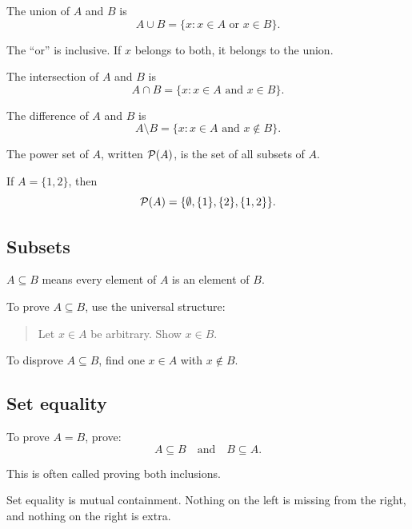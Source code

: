 \documentclass[12pt]{article}
\begin{document}
\begin{definition}
The union of $A$ and $B$ is
\[
A\cup B=\{x:x\in A\text{ or }x\in B\}.
\]
\end{definition}

The ``or'' is inclusive. If $x$ belongs to both, it belongs to the union.

\begin{definition}
The intersection of $A$ and $B$ is
\[
A\cap B=\{x:x\in A\text{ and }x\in B\}.
\]
\end{definition}

\begin{definition}
The difference of $A$ and $B$ is
\[
A\setminus B=\{x:x\in A\text{ and }x\notin B\}.
\]
\end{definition}

\begin{definition}
The power set of $A$, written $\mathcal{P}(A)$, is the set of all subsets of $A$.
\end{definition}

If $A=\{1,2\}$, then
\[
\mathcal{P}(A)=\{\emptyset,\{1\},\{2\},\{1,2\}\}.
\]

\subsection{Subsets}

\begin{definition}
$A\subseteq B$ means every element of $A$ is an element of $B$.
\end{definition}

To prove $A\subseteq B$, use the universal structure:

\begin{quote}
Let $x\in A$ be arbitrary. Show $x\in B$.
\end{quote}

To disprove $A\subseteq B$, find one $x\in A$ with $x\notin B$.

\subsection{Set equality}

To prove $A=B$, prove:
\[
A\subseteq B\quad\text{and}\quad B\subseteq A.
\]

This is often called proving both inclusions.

\begin{intuitionbox}
Set equality is mutual containment. Nothing on the left is missing from the right, and nothing on the right is extra.
\end{intuitionbox}
\end{document}
